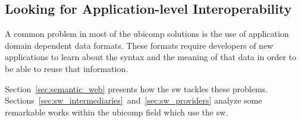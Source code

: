 \subsection{Looking for Application-level Interoperability}
\label{sec:interoperability}

A common problem in most of the \ac{ubicomp} solutions is the use of application domain dependent data formats.
These formats require developers of new applications to learn about the syntax and the meaning of that data in order to be able to reuse that information.

Section~\ref{sec:semantic_web} presents how the \acl{sw} tackles these problems.
Sections~\ref{sec:sw_intermediaries}~and~\ref{sec:sw_providers} analyze some remarkable works within the \ac{ubicomp} field which use the \ac{sw}.


